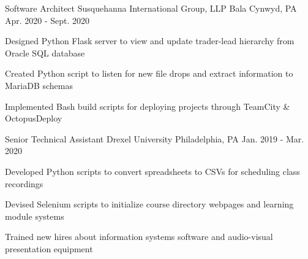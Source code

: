 

\begin{cventries}

  \cventry
  {Software Architect} %
  {Susquehanna International Group, LLP} %
  {Bala Cynwyd, PA} %
  {Apr. 2020 - Sept. 2020} %
  {
    \begin{cvitems} %
      \item {Designed Python Flask server to view and update trader-lead hierarchy from Oracle SQL database}
      \item {Created Python script to listen for new file drops and extract information to MariaDB schemas}
      \item {Implemented Bash build scripts for deploying projects through TeamCity \& OctopusDeploy}
    \end{cvitems}
  }

  \cventry
  {Senior Technical Assistant} %
  {Drexel University} %
  {Philadelphia, PA} %
  {Jan. 2019 - Mar. 2020} %
  {
    \begin{cvitems} %
      \item {Developed Python scripts to convert spreadsheets to CSVs for scheduling class recordings}
      \item {Devised Selenium scripts to initialize course directory webpages and learning module systems}
      \item {Trained new hires about information systems software and audio-visual presentation equipment}
    \end{cvitems}
  }

\end{cventries}
